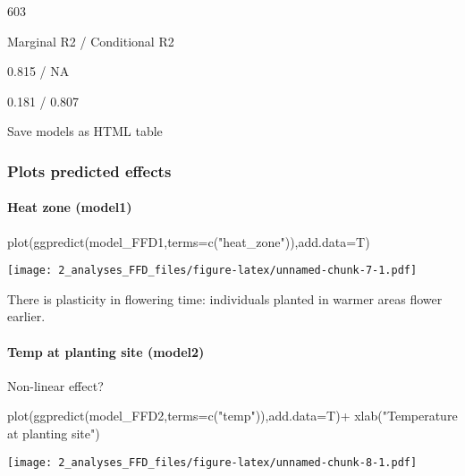 \documentclass[
]{article}
\newenvironment{Shaded}{\begin{snugshade}}{\end{snugshade}}
\newcommand{\AttributeTok}[1]{\textcolor[rgb]{0.77,0.63,0.00}{#1}}
\newcommand{\FunctionTok}[1]{\textcolor[rgb]{0.00,0.00,0.00}{#1}}
\newcommand{\NormalTok}[1]{#1}
\newcommand{\SpecialCharTok}[1]{\textcolor[rgb]{0.00,0.00,0.00}{#1}}
\newcommand{\StringTok}[1]{\textcolor[rgb]{0.31,0.60,0.02}{#1}}
\begin{document}
603

Marginal R2 / Conditional R2

0.815 / NA

0.181 / 0.807

Save models as HTML table

\hypertarget{plots-predicted-effects}{%
\subsubsection{Plots predicted effects}\label{plots-predicted-effects}}

\hypertarget{heat-zone-model1}{%
\paragraph{Heat zone (model1)}\label{heat-zone-model1}}

\begin{Shaded}
\begin{Highlighting}[]
\FunctionTok{plot}\NormalTok{(}\FunctionTok{ggpredict}\NormalTok{(model\_FFD1,}\AttributeTok{terms=}\FunctionTok{c}\NormalTok{(}\StringTok{"heat\_zone"}\NormalTok{)),}\AttributeTok{add.data=}\NormalTok{T)}
\end{Highlighting}
\end{Shaded}

\texttt{[image: 2\_analyses\_FFD\_files/figure-latex/unnamed-chunk-7-1.pdf]}

There is plasticity in flowering time: individuals planted in warmer
areas flower earlier.

\hypertarget{temp-at-planting-site-model2}{%
\paragraph{Temp at planting site
(model2)}\label{temp-at-planting-site-model2}}

Non-linear effect?

\begin{Shaded}
\begin{Highlighting}[]
\FunctionTok{plot}\NormalTok{(}\FunctionTok{ggpredict}\NormalTok{(model\_FFD2,}\AttributeTok{terms=}\FunctionTok{c}\NormalTok{(}\StringTok{"temp"}\NormalTok{)),}\AttributeTok{add.data=}\NormalTok{T)}\SpecialCharTok{+}
  \FunctionTok{xlab}\NormalTok{(}\StringTok{"Temperature at planting site"}\NormalTok{)}
\end{Highlighting}
\end{Shaded}

\texttt{[image: 2\_analyses\_FFD\_files/figure-latex/unnamed-chunk-8-1.pdf]}
\end{document}
